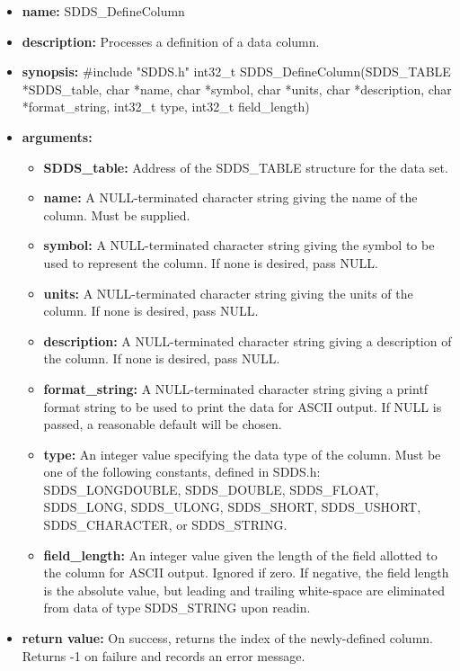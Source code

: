 \documentclass[11pt]{article}
\begin{document}
\begin{itemize}
\item {\bf name:}\newline
SDDS\_DefineColumn
\item {\bf description:}\newline
Processes a definition of a data column.
\item {\bf synopsis:} \#include "SDDS.h"\newline
int32\_t SDDS\_DefineColumn(SDDS\_TABLE *SDDS\_table, char *name, char *symbol, char *units, char *description, char *format\_string, int32\_t type, int32\_t field\_length)
\item {\bf arguments:}
\begin{itemize}
\item {\bf SDDS\_table:} Address of the SDDS\_TABLE structure for the data set.
\item {\bf name:} A NULL-terminated character string giving the name of the column. Must be supplied.
\item {\bf symbol:} A NULL-terminated character string giving the symbol to be used to represent the column. If none is desired, pass NULL.
\item {\bf units:} A NULL-terminated character string giving the units of the column. If none is desired, pass NULL.
\item {\bf description:} A NULL-terminated character string giving a description of the column. If none is desired, pass NULL.
\item {\bf format\_string:} A NULL-terminated character string giving a  printf format string to be used to print the data for ASCII output. If NULL is passed, a reasonable default will be chosen.
\item {\bf type:} An integer value specifying the data type of the column. Must be one of the following constants, defined in  SDDS.h: SDDS\_LONGDOUBLE, SDDS\_DOUBLE, SDDS\_FLOAT, SDDS\_LONG, SDDS\_ULONG, SDDS\_SHORT, SDDS\_USHORT, SDDS\_CHARACTER, or SDDS\_STRING.
\item {\bf field\_length:} An integer value given the length of the field allotted to the column for ASCII output. Ignored if zero. If negative, the field length is the absolute value, but leading and trailing white-space are eliminated from data of type SDDS\_STRING upon readin.
\end{itemize}
\item {\bf return value:}\newline
On success, returns the index of the newly-defined column. Returns -1 on failure and records an error message.

\end{itemize}
\end{document}
